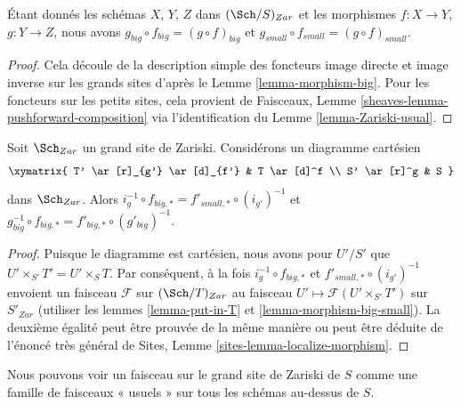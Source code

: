 \begin{lemma}
\label{lemma-composition}
Étant donnés les schémas $X$, $Y$, $Z$ dans $(\Sch/S)_{Zar}$ et les morphismes $f : X \to Y$, $g : Y \to Z$, nous avons $g_{big} \circ f_{big} = (g \circ f)_{big}$ et $g_{small} \circ f_{small} = (g \circ f)_{small}$.
\end{lemma}

\begin{proof}
Cela découle de la description simple des foncteurs image directe et image inverse sur les grands sites d'après le Lemme \ref{lemma-morphism-big}. Pour les foncteurs sur les petits sites, cela provient de Faisceaux, Lemme \ref{sheaves-lemma-pushforward-composition} via l'identification du Lemme \ref{lemma-Zariski-usual}.
\end{proof}

\begin{lemma}
\label{lemma-morphism-big-small-cartesian-diagram}
Soit $\Sch_{Zar}$ un grand site de Zariski. Considérons un diagramme cartésien
$$
\xymatrix{
T' \ar[r]_{g'} \ar[d]_{f'} & T \ar[d]^f \\
S' \ar[r]^g & S
}
$$
dans $\Sch_{Zar}$. Alors $i_g^{-1} \circ f_{big, *} = f'_{small, *} \circ (i_{g'})^{-1}$ et $g_{big}^{-1} \circ f_{big, *} = f'_{big, *} \circ (g'_{big})^{-1}$.
\end{lemma}

\begin{proof}
Puisque le diagramme est cartésien, nous avons pour $U'/S'$ que $U' \times_{S'} T' = U' \times_S T$. Par conséquent, à la fois $i_g^{-1} \circ f_{big, *}$ et $f'_{small, *} \circ (i_{g'})^{-1}$ envoient un faisceau $\mathcal{F}$ sur $(\Sch/T)_{Zar}$ au faisceau $U' \mapsto \mathcal{F}(U' \times_{S'} T')$ sur $S'_{Zar}$ (utiliser les lemmes \ref{lemma-put-in-T} et \ref{lemma-morphism-big-small}). La deuxième égalité peut être prouvée de la même manière ou peut être déduite de l'énoncé très général de Sites, Lemme \ref{sites-lemma-localize-morphism}.
\end{proof}


\noindent
Nous pouvons voir un faisceau sur le grand site de Zariski de $S$ comme une famille de faisceaux « usuels » sur tous les schémas au-dessus de $S$.


